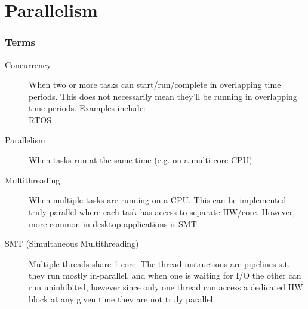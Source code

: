 \documentclass{article}
\begin{document}
\part{Parallelism}
\section{Terms}
\begin{description}
	\item[Concurrency]
	      When two or more tasks can start/run/complete in overlapping time periods. This does not necessarily mean they'll be running in overlapping time periods. Examples include: \\ RTOS
\end{description}
\begin{description}
	\item[Parallelism]
	      When tasks run at the same time (e.g. on a multi-core CPU)
\end{description}
\begin{description}
	\item[Multithreading]
	      When multiple tasks are running on a CPU. This can be implemented truly parallel where each task has access to separate HW/core. However, more common in desktop applications is SMT.
\end{description}
\begin{description}
	\item[SMT (Simultaneous Multithreading)]
	      Multiple threads share 1 core. The thread instructions are pipelines s.t. they run mostly in-parallel, and when one is waiting for I/O the other can run uninhibited, however since only one thread can access a dedicated HW block at any given time they are not truly parallel.
\end{description}
\end{document}
